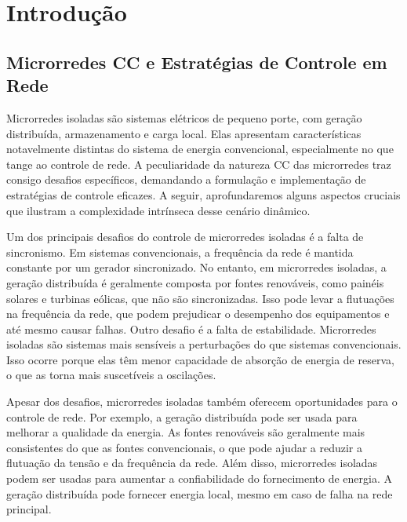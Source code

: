 

\chapter{Introdução}

\section{Microrredes CC e Estratégias de Controle em Rede}

Microrredes isoladas são sistemas elétricos de pequeno porte, com geração distribuída, armazenamento e carga local. Elas apresentam características notavelmente distintas do sistema de energia convencional, especialmente no que tange ao controle de rede. A peculiaridade da natureza CC das microrredes traz consigo desafios específicos, demandando a formulação e implementação de estratégias de controle eficazes. A seguir, aprofundaremos alguns aspectos cruciais que ilustram a complexidade intrínseca desse cenário dinâmico.

Um dos principais desafios do controle de microrredes isoladas é a falta de sincronismo. Em sistemas convencionais, a frequência da rede é mantida constante por um gerador sincronizado. No entanto, em microrredes isoladas, a geração distribuída é geralmente composta por fontes renováveis, como painéis solares e turbinas eólicas, que não são sincronizadas. Isso pode levar a flutuações na frequência da rede, que podem prejudicar o desempenho dos equipamentos e até mesmo causar falhas. Outro desafio é a falta de estabilidade. Microrredes isoladas são sistemas mais sensíveis a perturbações do que sistemas convencionais. Isso ocorre porque elas têm menor capacidade de absorção de energia de reserva, o que as torna mais suscetíveis a oscilações.

Apesar dos desafios, microrredes isoladas também oferecem oportunidades para o controle de rede. Por exemplo, a geração distribuída pode ser usada para melhorar a qualidade da energia. As fontes renováveis são geralmente mais consistentes do que as fontes convencionais, o que pode ajudar a reduzir a flutuação da tensão e da frequência da rede. Além disso, microrredes isoladas podem ser usadas para aumentar a confiabilidade do fornecimento de energia. A geração distribuída pode fornecer energia local, mesmo em caso de falha na rede principal.

